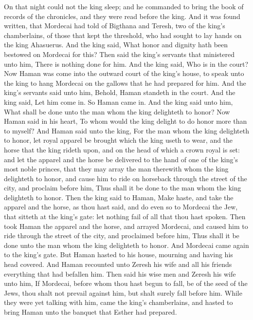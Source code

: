 On that night could not the king sleep; and he commanded to bring the book of records of the chronicles, and they were read before the king. And it was found written, that Mordecai had told of Bigthana and Teresh, two of the king’s chamberlains, of those that kept the threshold, who had sought to lay hands on the king Ahasuerus. And the king said, What honor and dignity hath been bestowed on Mordecai for this? Then said the king’s servants that ministered unto him, There is nothing done for him. And the king said, Who is in the court? Now Haman was come into the outward court of the king’s house, to speak unto the king to hang Mordecai on the gallows that he had prepared for him. And the king’s servants said unto him, Behold, Haman standeth in the court. And the king said, Let him come in. So Haman came in. And the king said unto him, What shall be done unto the man whom the king delighteth to honor? Now Haman said in his heart, To whom would the king delight to do honor more than to myself? And Haman said unto the king, For the man whom the king delighteth to honor, let royal apparel be brought which the king useth to wear, and the horse that the king rideth upon, and on the head of which a crown royal is set: and let the apparel and the horse be delivered to the hand of one of the king’s most noble princes, that they may array the man therewith whom the king delighteth to honor, and cause him to ride on horseback through the street of the city, and proclaim before him, Thus shall it be done to the man whom the king delighteth to honor.  Then the king said to Haman, Make haste, and take the apparel and the horse, as thou hast said, and do even so to Mordecai the Jew, that sitteth at the king’s gate: let nothing fail of all that thou hast spoken. Then took Haman the apparel and the horse, and arrayed Mordecai, and caused him to ride through the street of the city, and proclaimed before him, Thus shall it be done unto the man whom the king delighteth to honor. And Mordecai came again to the king’s gate. But Haman hasted to his house, mourning and having his head covered. And Haman recounted unto Zeresh his wife and all his friends everything that had befallen him. Then said his wise men and Zeresh his wife unto him, If Mordecai, before whom thou hast begun to fall, be of the seed of the Jews, thou shalt not prevail against him, but shalt surely fall before him. While they were yet talking with him, came the king’s chamberlains, and hasted to bring Haman unto the banquet that Esther had prepared. 

